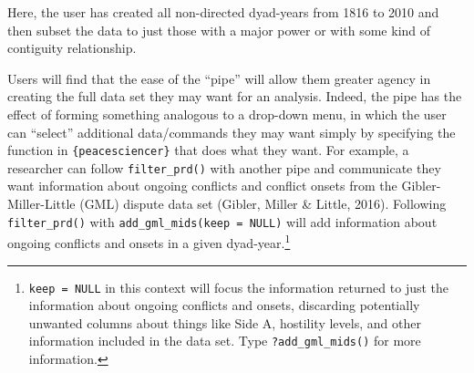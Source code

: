 \documentclass[
  11pt,
]{article}
\begin{document}
Here, the user has created all non-directed dyad-years from 1816 to 2010 and then subset the data to just those with a major power or with some kind of contiguity relationship.

Users will find that the ease of the ``pipe'' will allow them greater agency in creating the full data set they may want for an analysis. Indeed, the pipe has the effect of forming something analogous to a drop-down menu, in which the user can ``select'' additional data/commands they may want simply by specifying the function in \texttt{\{peacesciencer\}} that does what they want. For example, a researcher can follow \texttt{filter\_prd()} with another pipe and communicate they want information about ongoing conflicts and conflict onsets from the Gibler-Miller-Little (GML) dispute data set (Gibler, Miller \& Little, 2016). Following \texttt{filter\_prd()} with \texttt{add\_gml\_mids(keep\ =\ NULL)} will add information about ongoing conflicts and onsets in a given dyad-year.\footnote{\texttt{keep\ =\ NULL} in this context will focus the information returned to just the information about ongoing conflicts and onsets, discarding potentially unwanted columns about things like Side A, hostility levels, and other information included in the data set. Type \texttt{?add\_gml\_mids()} for more information.}
\end{document}
